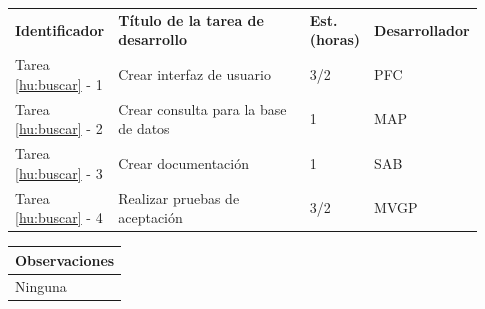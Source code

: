 \documentclass[11pt]{article}
\begin{document}
\begin{longtable}{p{0.18\linewidth}|p{0.48\linewidth}|p{0.1\linewidth}|p{0.17\linewidth}}
  \toprule
  \textbf{Identificador} & \textbf{Título de la tarea de desarrollo} & \textbf{Est. (horas)} & \textbf{Desarrollador} \\
  Tarea \ref{hu:buscar} - 1 & Crear interfaz de usuario & 3/2 & PFC\\
  Tarea \ref{hu:buscar} - 2 & Crear consulta para la base de datos & 1 & MAP\\
  Tarea \ref{hu:buscar} - 3 & Crear documentación & 1 & SAB\\
  Tarea \ref{hu:buscar} - 4 & Realizar pruebas de aceptación & 3/2 &  MVGP\\
  \bottomrule
\end{longtable}
\vspace{-0.8cm}
\begin{longtable}{p{1.028\linewidth}}
  \textbf{Observaciones}\\
  \midrule
  Ninguna\\
  \bottomrule
\end{longtable}
\end{document}
